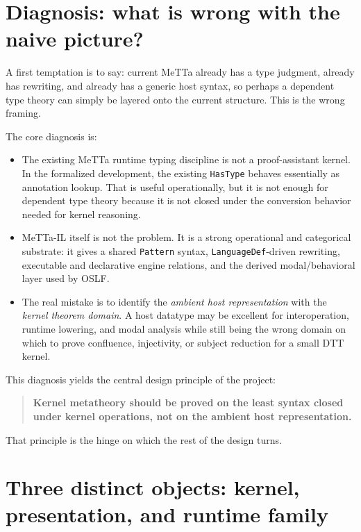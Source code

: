 \documentclass[11pt]{article}
\begin{document}
\section{Diagnosis: what is wrong with the naive picture?}

A first temptation is to say: current MeTTa already has a type judgment, already has rewriting, and already has a generic host syntax, so perhaps a dependent type theory can simply be layered onto the current structure. This is the wrong framing.

The core diagnosis is:

\begin{itemize}
  \item The existing MeTTa runtime typing discipline is not a proof-assistant kernel. In the formalized development, the existing \texttt{HasType} behaves essentially as annotation lookup. That is useful operationally, but it is not enough for dependent type theory because it is not closed under the conversion behavior needed for kernel reasoning.
  \item MeTTa-IL itself is not the problem. It is a strong operational and categorical substrate: it gives a shared \texttt{Pattern} syntax, \texttt{LanguageDef}-driven rewriting, executable and declarative engine relations, and the derived modal/behavioral layer used by OSLF.
  \item The real mistake is to identify the \emph{ambient host representation} with the \emph{kernel theorem domain}. A host datatype may be excellent for interoperation, runtime lowering, and modal analysis while still being the wrong domain on which to prove confluence, injectivity, or subject reduction for a small DTT kernel.
\end{itemize}

This diagnosis yields the central design principle of the project:

\begin{quote}
\textbf{Kernel metatheory should be proved on the least syntax closed under kernel operations, not on the ambient host representation.}
\end{quote}

That principle is the hinge on which the rest of the design turns.

\section{Three distinct objects: kernel, presentation, and runtime family}
\end{document}
